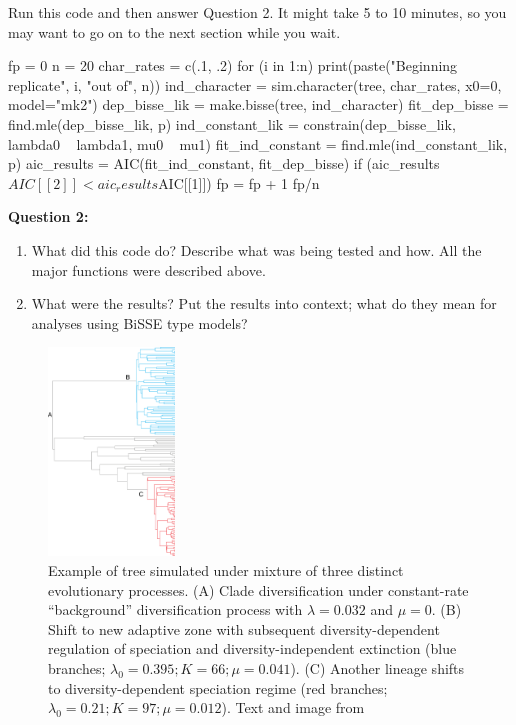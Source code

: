 \documentclass[11pt]{article}
\begin{document}
Run this code and then answer Question 2. 
It might take 5 to 10 minutes, so you may want to
go on to the next section while you wait.
\begin{code}
fp = 0
n = 20
char_rates = c(.1, .2)
for (i in 1:n) {
    print(paste("Beginning replicate", i, "out of", n))
    ind_character = sim.character(tree, char_rates, x0=0, model="mk2")
    dep_bisse_lik = make.bisse(tree, ind_character)
    fit_dep_bisse = find.mle(dep_bisse_lik, p)
    ind_constant_lik = constrain(dep_bisse_lik, lambda0 ~ lambda1, mu0 ~ mu1)
    fit_ind_constant = find.mle(ind_constant_lik, p)
    aic_results = AIC(fit_ind_constant, fit_dep_bisse)
    if (aic_results$AIC[[2]] < aic_results$AIC[[1]])
        fp = fp + 1
}
fp/n
\end{code}

\begin{framed}
\noindent
\textbf{Question 2:} \\
\begin{enumerate}
\item What did this code do? Describe what was being tested and how.
    All the major functions were described above.
\item What were the results? Put the results into context; what do
    they mean for analyses using BiSSE type models?
\end{enumerate}
\end{framed}

\begin{figure}[H]
\centering
\includegraphics[width=0.3\textwidth]{bamm.png}
\caption{
    Example of tree simulated under mixture of three distinct evolutionary processes.
    (A) Clade diversification under constant-rate ``background'' diversification process with 
    $\lambda = 0.032$ and $\mu = 0$. 
    (B) Shift to new adaptive zone with subsequent diversity-dependent regulation of 
    speciation and diversity-independent extinction 
    (blue branches; $\lambda_0 = 0.395; K = 66; \mu = 0.041$). 
    (C) Another lineage shifts to diversity-dependent speciation regime (red branches; 
    $\lambda_0 = 0.21; K = 97; \mu = 0.012$).
    Text and image from \protect\citet{rabosky2014automatic}}
\end{figure}
\end{document}

